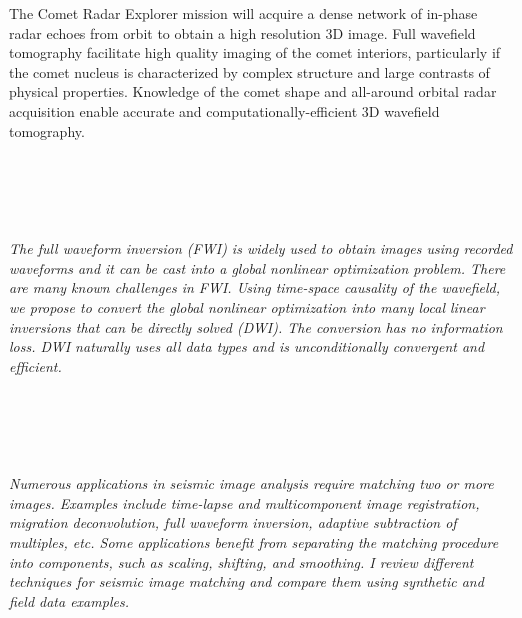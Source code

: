 \begin{multicols}{2}
{The Comet Radar Explorer mission will acquire a dense network of in-phase radar echoes from orbit to obtain a high resolution 3D image. Full wavefield tomography facilitate high quality imaging of the comet interiors, particularly if the comet nucleus is characterized by complex structure and large contrasts of physical properties. Knowledge of the comet shape and all-around orbital radar acquisition enable accurate and computationally-efficient 3D wavefield tomography.}\\
\\ 
        \\
        \\\\
\\
      \textit{The full waveform inversion (FWI) is widely used to obtain images using recorded waveforms and it can be cast into a global nonlinear optimization problem. There are many known challenges in FWI. Using time-space causality of the wavefield, we propose to convert the global nonlinear optimization into many local linear inversions that can be directly solved (DWI). The conversion has no information loss. DWI naturally uses all data types and is unconditionally convergent and efficient.}\\
\\ 
        \\
        \\\\
\\
      \textit{Numerous applications in seismic image analysis require matching two or more images. Examples include time-lapse and multicomponent image registration, migration deconvolution, full waveform inversion, adaptive subtraction of multiples, etc. Some applications benefit from separating the matching procedure into components, such as scaling, shifting, and smoothing. I review different techniques for seismic image matching and compare them using synthetic and field data examples.}\\
\\ 
        \\
        \\\\
        \\
        \\\\
\\

\end{multicols}
